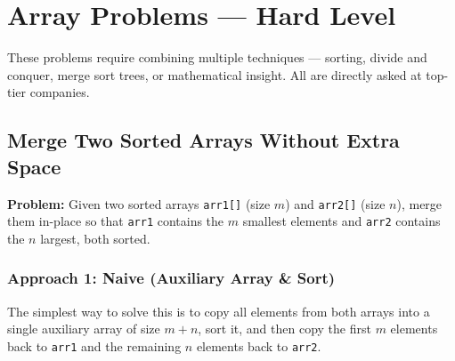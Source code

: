 \documentclass[12pt,a4paper,oneside]{book}
\begin{document}

\chapter{Array Problems --- Hard Level}

{\sloppy These problems require combining multiple techniques --- sorting, divide and conquer, merge sort trees, or mathematical insight. All are directly asked at top-tier companies.\par}

\section{Merge Two Sorted Arrays Without Extra Space}

\textbf{Problem:} Given two sorted arrays \texttt{arr1[]} (size $m$) and \texttt{arr2[]} (size $n$), merge them in-place so that \texttt{arr1} contains the $m$ smallest elements and \texttt{arr2} contains the $n$ largest, both sorted.

\subsection{Approach 1: Naive (Auxiliary Array \& Sort)}
The simplest way to solve this is to copy all elements from both arrays into a single auxiliary array of size $m+n$, sort it, and then copy the first $m$ elements back to \texttt{arr1} and the remaining $n$ elements back to \texttt{arr2}.
\end{document}
